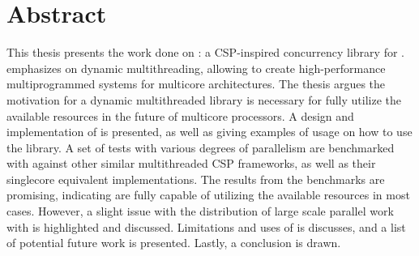 
\newpage
{}
\section*{Abstract}

This thesis presents the work done on \Proxc{}: a CSP\hyp{}inspired concurrency library for \Cpp{}. \Proxc{} emphasizes on dynamic multithreading, allowing to create high\hyp{}performance multiprogrammed systems for multicore architectures. The thesis argues the motivation for a dynamic multithreaded library is necessary for fully utilize the available resources in the future of multicore processors. A design and implementation of \Proxc{} is presented, as well as giving examples of usage on how to use the library. A set of tests with various degrees of parallelism are benchmarked with \Proxc{} against other similar multithreaded CSP frameworks, as well as their singlecore equivalent implementations. The results from the benchmarks are promising, indicating \Proxc{} are fully capable of utilizing the available resources in most cases. However, a slight issue with the distribution of large scale parallel work with \Proxc{} is highlighted and discussed. Limitations and uses of \Proxc{} is discusses, and a list of potential future work is presented. Lastly, a conclusion is drawn.

\vfill

\afterpage{\blankpage}
